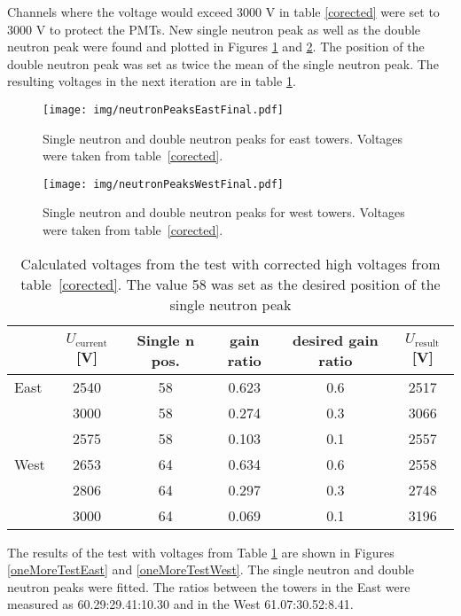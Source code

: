 \documentclass[a4paper,10pt]{report}
\begin{document}
Channels where the voltage would exceed 3000 V in table \ref{corected} were set to 3000 V to
protect the PMTs. New single neutron peak as well as the double neutron peak were found and
plotted in Figures \ref{eastThird}
and \ref{westThird}. The position of the double neutron peak was set as twice the mean
of the single neutron peak.
The resulting voltages in the next iteration are in table \ref{thirdCalib}.

\begin{figure}[htb]
\begin{center}
\texttt{[image: img/neutronPeaksEastFinal.pdf]}
\end{center}
\caption{Single neutron and double neutron peaks for east towers.
Voltages were taken from table~\ref{corected}.}
\label{eastThird}
\end{figure}

\begin{figure}[htb]
\begin{center}
\texttt{[image: img/neutronPeaksWestFinal.pdf]}
\end{center}
\caption{Single neutron and double neutron peaks for west towers.
Voltages were taken from table~\ref{corected}.}
\label{westThird}
\end{figure}

\begin{table}[htb] 
\caption{Calculated voltages from the test with corrected high voltages from table~\ref{corected}.
The value 58 was set as the desired position of the single neutron peak}
\label{thirdCalib}
\begin{center}
\begin{tabular}{lccccc}
 \toprule
 &$U_\text{current}$[V]&Single n pos.&gain ratio&desired gain ratio&$U_\text{result}$[V]\\
\midrule
East  &2540  &58 &0.623  &0.6 &2517 \\
      &3000  &58 &0.274  &0.3 &3066 \\
      &2575  &58 &0.103	&0.1 &2557 \\
\midrule
West  &2653  &64 &0.634 &0.6 &2558 \\
      &2806  &64 &0.297 &0.3 &2748 \\
      &3000  &64 &0.069 &0.1 &3196 \\
\bottomrule
\end{tabular}
\end{center}
\end{table}

The results of the test with voltages from Table \ref{thirdCalib} are shown in
Figures \ref{oneMoreTestEast} and \ref{oneMoreTestWest}\@. The single neutron and double
neutron peaks were fitted. The ratios between the towers in the East were measured as
60.29:29.41:10.30 and in the West 61.07:30.52:8.41. 
\end{document}
